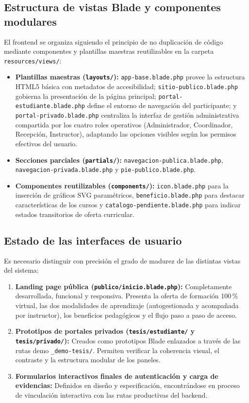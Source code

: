 \subsection{Estructura de vistas Blade y componentes modulares}
\label{sec:vistas_blade}

El frontend se organiza siguiendo el principio de no duplicación de código mediante componentes y plantillas maestras reutilizables en la carpeta \texttt{resources/views/}:

\begin{itemize}
    \item \textbf{Plantillas maestras (\texttt{layouts/}):} \texttt{app-base.blade.php} provee la estructura HTML5 básica con metadatos de accesibilidad; \texttt{sitio-publico.blade.php} gobierna la presentación de la página principal; \texttt{portal-estudiante.blade.php} define el entorno de navegación del participante; y \texttt{portal-privado.blade.php} centraliza la interfaz de gestión administrativa compartida por los cuatro roles operativos (Administrador, Coordinador, Recepción, Instructor), adaptando las opciones visibles según los permisos efectivos del usuario.
    \item \textbf{Secciones parciales (\texttt{partials/}):} \texttt{navegacion-publica.blade.php}, \texttt{navegacion-privada.blade.php} y \texttt{pie-publico.blade.php}.
    \item \textbf{Componentes reutilizables (\texttt{components/}):} \texttt{icon.blade.php} para la inserción de gráficos SVG paramétricos, \texttt{beneficio.blade.php} para destacar características de los cursos y \texttt{catalogo-pendiente.blade.php} para indicar estados transitorios de oferta curricular.
\end{itemize}

\subsection{Estado de las interfaces de usuario}
\label{sec:estado_interfaces}

Es necesario distinguir con precisión el grado de madurez de las distintas vistas del sistema:
\begin{enumerate}
    \item \textbf{Landing page pública (\texttt{publico/inicio.blade.php}):} Completamente desarrollada, funcional y responsiva. Presenta la oferta de formación 100\,\% virtual, las dos modalidades de aprendizaje (autogestionada y acompañada por instructor), los beneficios pedagógicos y el flujo paso a paso de acceso.
    \item \textbf{Prototipos de portales privados (\texttt{tesis/estudiante/} y \texttt{tesis/privado/}):} Creados como prototipos Blade enlazados a través de las rutas demo \texttt{\_demo-tesis/}. Permiten verificar la coherencia visual, el contraste y la estructura modular de los paneles.
    \item \textbf{Formularios interactivos finales de autenticación y carga de evidencias:} Definidos en diseño y especificación, encontrándose en proceso de vinculación interactiva con las rutas productivas del backend.
\end{enumerate}

